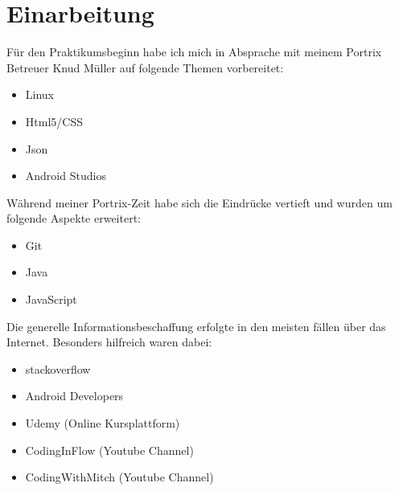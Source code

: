 \newpage
\chapter{Einarbeitung}
F\"ur den Praktikumsbeginn habe ich mich in Absprache mit meinem Portrix Betreuer Knud M\"uller auf folgende Themen vorbereitet:
\begin{itemize}
\item Linux
\item Html5/CSS
\item Json
\item Android Studios
\end{itemize}

W\"ahrend meiner Portrix-Zeit habe sich die Eindr\"ucke vertieft und wurden um folgende Aspekte erweitert:

\begin{itemize}
\item Git
\item Java
\item JavaScript
\end{itemize}

Die generelle Informationsbeschaffung erfolgte in den meisten f\"allen \"uber das Internet. Besonders hilfreich waren dabei:

\begin{itemize}
\item stackoverflow
\item Android Developers
\item Udemy (Online Kursplattform)
\item CodingInFlow (Youtube Channel)
\item CodingWithMitch (Youtube Channel)
\end{itemize}


